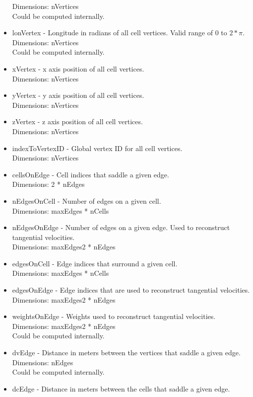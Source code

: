 \documentclass[11pt]{report}
\begin{document}
\begin{itemize}
		  Dimensions: nVertices \\
		  Could be computed internally. 
	\item lonVertex - Longitude in radians of all cell vertices. Valid range of $0$ to $2*\pi$. \\
		  Dimensions: nVertices \\
		  Could be computed internally. 
	\item xVertex - x axis position of all cell vertices. \\
		  Dimensions: nVertices
	\item yVertex - y axis position of all cell vertices. \\
		  Dimensions: nVertices
	\item zVertex - z axis position of all cell vertices. \\
		  Dimensions: nVertices
	\item indexToVertexID - Global vertex ID for all cell vertices. \\
		  Dimensions: nVertices
	\item cellsOnEdge - Cell indices that saddle a given edge. \\
		  Dimensions: 2 * nEdges
	\item nEdgesOnCell - Number of edges on a given cell. \\
		  Dimensions: maxEdges * nCells
	\item nEdgesOnEdge - Number of edges on a given edge. Used to reconstruct tangential velocities. \\
		  Dimensions: maxEdges2 * nEdges
	\item edgesOnCell - Edge indices that surround a given cell. \\
		  Dimensions: maxEdges * nCells
	\item edgesOnEdge - Edge indices that are used to reconstruct tangential velocities. \\
		  Dimensions: maxEdges2 * nEdges
	\item weightsOnEdge - Weights used to reconstruct tangential velocities. \\
		  Dimensions: maxEdges2 * nEdges \\
		  Could be computed internally. 
	\item dvEdge - Distance in meters between the vertices that saddle a given edge. \\
		  Dimensions: nEdges \\
		  Could be computed internally. 
	\item dcEdge - Distance in meters between the cells that saddle a given edge. \\

\end{itemize}
\end{document}

